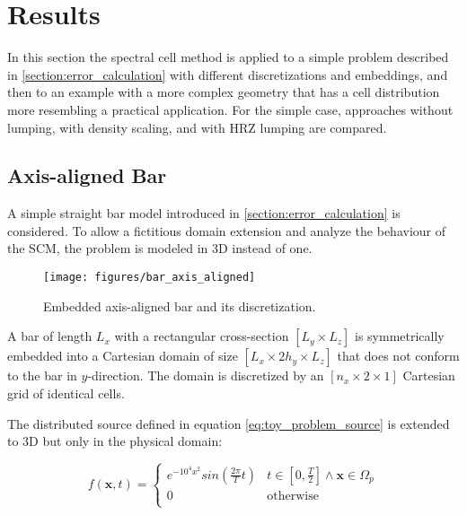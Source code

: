 %
\section{Results}
\label{section:results}
%

In this section the spectral cell method is applied to a simple problem described in \ref{section:error_calculation} with different discretizations and embeddings, and then to an example with a more complex geometry that has a cell distribution more resembling a practical application. For the simple case, approaches without lumping, with density scaling, and with HRZ lumping are compared.

%
\subsection{Axis-aligned Bar}
\label{section:axis_aligned_bar}
%

A simple straight bar model introduced in \ref{section:error_calculation} is considered. To allow a fictitious domain extension and analyze the behaviour of the SCM, the problem is modeled in 3D instead of one.

\begin{figure}[!h]
	\centering
	\texttt{[image: figures/bar\_axis\_aligned]}
	\caption{Embedded axis-aligned bar and its discretization.}
	\label{fig:bar_axis_aligned}
\end{figure}

A bar of length $L_x$ with a rectangular cross-section $[L_y \times L_z]$ is symmetrically embedded into a Cartesian domain of size $[L_x \times 2h_y \times L_z]$ that does not conform to the bar in $y$-direction. The domain is discretized by an $[n_x \times 2 \times 1]$ Cartesian grid of identical cells.

The distributed source defined in equation \ref{eq:toy_problem_source} is extended to 3D but only in the physical domain:

\begin{equation} \label{eq:axis_aligned_source}
	f(\mathbf x,t) = \begin{cases}
	e^{-10^4x^2} sin \left( \frac{2 \pi}{T} t \right) & t \in \left[ 0,\frac{T}{2} \right] \land \mathbf x \in \Omega_p \\[0.5em]
	0 & \text{otherwise} \\
	\end{cases}
\end{equation}

